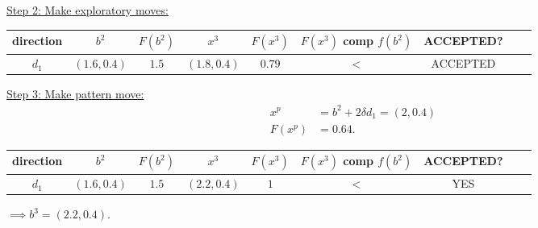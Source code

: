 \documentclass{article}
\begin{document}
\underline{Step 2: Make exploratory moves:}
\newline

\begin{tabular}{ |c|c|c|c|c|c|c|c|c| }
\hline
direction & $b^2$ & $F(b^2)$ & $x^3$ & $F(x^3)$ & $F(x^3)$ \: comp \: $f(b^2)$ & ACCEPTED? \\ 
\hline
$d_1$ & $(1.6, 0.4)$ & $1.5$ & $(1.8, 0.4)$ & $0.79$ & $<$ & ACCEPTED \\ 
\hline
\end{tabular}
\newline

\underline{Step 3: Make pattern move:}
\begin{align*}
  x^p &= b^2 + 2 \delta d_1 = (2, 0.4) \\
  F(x^p) & = 0.64.
\end{align*}

\begin{tabular}{ |c|c|c|c|c|c|c|c|c| }
\hline
direction & $b^2$ & $F(b^2)$ & $x^3$ & $F(x^3)$ & $F(x^3)$ \: comp \: $f(b^2)$ & ACCEPTED? \\ 
\hline
$d_1$ & $(1.6, 0.4)$ & $1.5$ & $(2.2, 0.4)$ & $1$ & $<$ & YES \\
\hline
\end{tabular}
\newline

$\implies b^3 = (2.2, 0.4)$.
\newline
\end{document}
